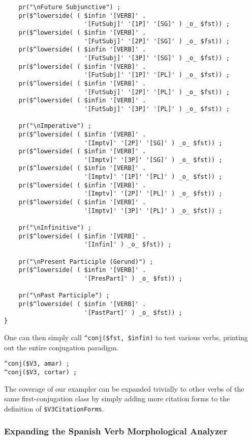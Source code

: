 \begin{Verbatim}
    pr("\nFuture Subjunctive") ;
    pr($^lowerside( ( $infin '[VERB]' . 
                      '[FutSubj]' '[1P]' '[SG]' ) _o_ $fst)) ;
    pr($^lowerside( ( $infin '[VERB]' . 
                      '[FutSubj]' '[2P]' '[SG]' ) _o_ $fst)) ;
    pr($^lowerside( ( $infin '[VERB]' . 
                      '[FutSubj]' '[3P]' '[SG]' ) _o_ $fst)) ;
    pr($^lowerside( ( $infin '[VERB]' . 
                      '[FutSubj]' '[1P]' '[PL]' ) _o_ $fst)) ;
    pr($^lowerside( ( $infin '[VERB]' . 
                      '[FutSubj]' '[2P]' '[PL]' ) _o_ $fst)) ;
    pr($^lowerside( ( $infin '[VERB]' . 
                      '[FutSubj]' '[3P]' '[PL]' ) _o_ $fst)) ;

    pr("\nImperative") ;
    pr($^lowerside( ( $infin '[VERB]' . 
                      '[Imptv]' '[2P]' '[SG]' ) _o_ $fst)) ;
    pr($^lowerside( ( $infin '[VERB]' . 
                      '[Imptv]' '[3P]' '[SG]' ) _o_ $fst)) ;
    pr($^lowerside( ( $infin '[VERB]' . 
                      '[Imptv]' '[1P]' '[PL]' ) _o_ $fst)) ;
    pr($^lowerside( ( $infin '[VERB]' . 
                      '[Imptv]' '[2P]' '[PL]' ) _o_ $fst)) ;
    pr($^lowerside( ( $infin '[VERB]' . 
                      '[Imptv]' '[3P]' '[PL]' ) _o_ $fst)) ;

    pr("\nInfinitive") ;
    pr($^lowerside( ( $infin '[VERB]' . 
                      '[Infin]' ) _o_ $fst)) ;

    pr("\nPresent Participle (Gerund)") ;
    pr($^lowerside( ( $infin '[VERB]' . 
                      '[PresPart]' ) _o_ $fst)) ;

    pr("\nPast Participle") ;
    pr($^lowerside( ( $infin '[VERB]' . 
                      '[PastPart]' ) _o_ $fst)) ;
}
\end{Verbatim}

\noindent
One can then simply call \verb!^conj($fst, $infin)! to test various verbs,
printing out the entire conjugation paradigm.  

\begin{Verbatim}
^conj($V3, amar) ;
^conj($V3, cortar) ;
\end{Verbatim}

\noindent
The coverage of our exampler can be expanded trivially to other verbs of the same
first-conjugation class
by simply adding more citation forms to the definition of \verb!$V3CitationForms!.

\subsubsection{Expanding the Spanish Verb Morphological Analyzer}

